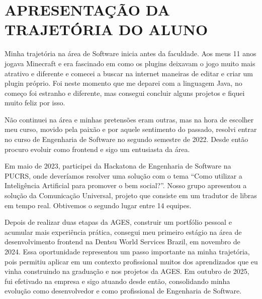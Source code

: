 \chapter[APRESENTAÇÃO DA TRAJETÓRIA DO ALUNO]{APRESENTAÇÃO DA TRAJETÓRIA DO ALUNO}

Minha trajetória na área de Software inicia antes da faculdade. Aos
meus 11 anos jogava Minecraft e era fascinado em como os plugins
deixavam o jogo muito mais atrativo e diferente e comecei a buscar na
internet maneiras de editar e criar um plugin próprio. Foi neste momento que
me deparei com a linguagem Java, no começo foi estranho e diferente, mas
consegui concluir alguns projetos e fiquei muito feliz por isso.
\par Não continuei na área e minhas pretensões eram outras, mas na
hora de escolher meu curso, movido pela paixão e por aquele sentimento do passado, resolvi entrar no curso de
Engenharia de Software no segundo semestre de 2022. Desde então
procuro evoluir como frontend e sigo um entusiasta da área.
\par Em maio de 2023, participei da Hackatona de Engenharia de
Software na PUCRS, onde deveríamos resolver uma solução com o tema
“Como utilizar a Inteligência Artificial para promover o bem social?”. Nosso
grupo apresentou a solução da Comunicação Universal, projeto que
consiste em um tradutor de libras em tempo real. Obtivemos o segundo
lugar entre 14 equipes.

\par Depois de realizar duas etapas da AGES, construir um portfólio pessoal e
acumular mais experiência prática, consegui meu primeiro estágio na área de
desenvolvimento frontend na Dentsu World Services Brazil, em novembro de 2024.
Essa oportunidade representou um passo importante na minha trajetória, pois
permitiu aplicar em um contexto profissional muitos dos aprendizados que eu vinha
construindo na graduação e nos projetos da AGES. Em outubro de 2025, fui efetivado
na empresa e sigo atuando desde então, consolidando minha evolução como
desenvolvedor e como profissional de Engenharia de Software.
